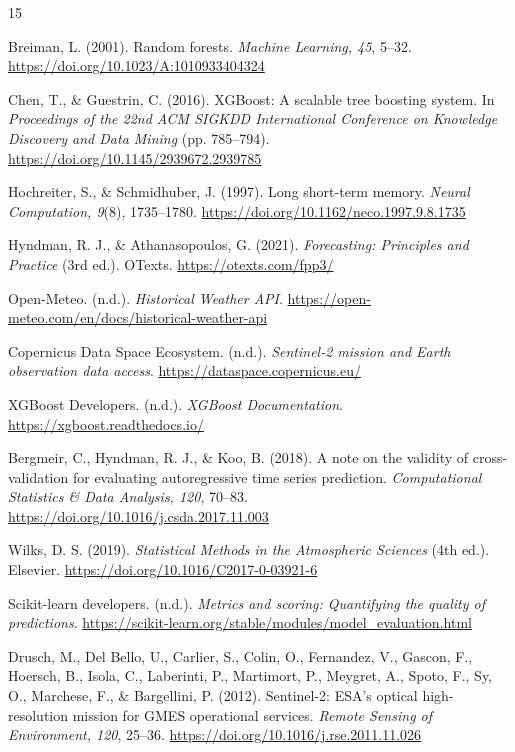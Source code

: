 \documentclass[12pt,a4paper]{article}
\begin{document}
	\begin{thebibliography}{15}
		
		Breiman, L. (2001). Random forests. \textit{Machine Learning, 45}, 5--32.
		\url{https://doi.org/10.1023/A:1010933404324}
		
		Chen, T., \& Guestrin, C. (2016). XGBoost: A scalable tree boosting system.
		In \textit{Proceedings of the 22nd ACM SIGKDD International Conference on
			Knowledge Discovery and Data Mining} (pp. 785--794).
		\url{https://doi.org/10.1145/2939672.2939785}
		
		Hochreiter, S., \& Schmidhuber, J. (1997). Long short-term memory.
		\textit{Neural Computation, 9}(8), 1735--1780.
		\url{https://doi.org/10.1162/neco.1997.9.8.1735}
		
		Hyndman, R. J., \& Athanasopoulos, G. (2021).
		\textit{Forecasting: Principles and Practice} (3rd ed.). OTexts.
		\url{https://otexts.com/fpp3/}
		
		Open-Meteo. (n.d.). \textit{Historical Weather API}.
		\url{https://open-meteo.com/en/docs/historical-weather-api}
		
		Copernicus Data Space Ecosystem. (n.d.).
		\textit{Sentinel-2 mission and Earth observation data access}.
		\url{https://dataspace.copernicus.eu/}
		
		XGBoost Developers. (n.d.). \textit{XGBoost Documentation}.
		\url{https://xgboost.readthedocs.io/}
		
		Bergmeir, C., Hyndman, R. J., \& Koo, B. (2018). A note on the validity
		of cross-validation for evaluating autoregressive time series prediction.
		\textit{Computational Statistics \& Data Analysis, 120}, 70--83.
		\url{https://doi.org/10.1016/j.csda.2017.11.003}
		
		Wilks, D. S. (2019). \textit{Statistical Methods in the Atmospheric Sciences}
		(4th ed.). Elsevier.
		\url{https://doi.org/10.1016/C2017-0-03921-6}
		
		Scikit-learn developers. (n.d.). \textit{Metrics and scoring: Quantifying the quality of predictions}.
		\url{https://scikit-learn.org/stable/modules/model_evaluation.html}
		
		Drusch, M., Del Bello, U., Carlier, S., Colin, O., Fernandez, V.,
		Gascon, F., Hoersch, B., Isola, C., Laberinti, P., Martimort, P.,
		Meygret, A., Spoto, F., Sy, O., Marchese, F., \& Bargellini, P. (2012).
		Sentinel-2: ESA's optical high-resolution mission for GMES operational services.
		\textit{Remote Sensing of Environment, 120}, 25--36.
		\url{https://doi.org/10.1016/j.rse.2011.11.026}
		

\end{thebibliography}
\end{document}
